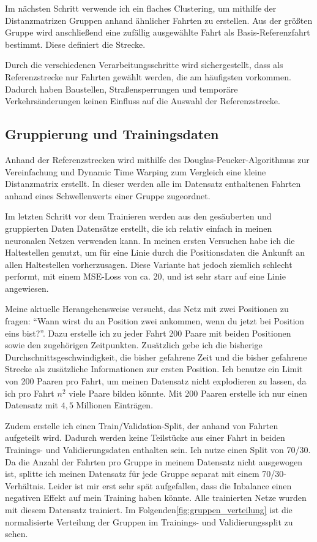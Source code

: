 \documentclass[a4paper]{article}
\begin{document}
    Im nächsten Schritt verwende ich ein flaches Clustering\cite{modernhierachical}, um mithilfe der Distanzmatrizen
    Gruppen anhand ähnlicher Fahrten zu erstellen. Aus der größten Gruppe wird anschließend eine zufällig ausgewählte
    Fahrt als Basis-Referenzfahrt bestimmt. Diese definiert die Strecke.

    Durch die verschiedenen Verarbeitungsschritte wird sichergestellt, dass als Referenzstrecke nur Fahrten gewählt
    werden, die am häufigsten vorkommen. Dadurch haben Baustellen, Straßensperrungen und temporäre Verkehrsänderungen
    keinen Einfluss auf die Auswahl der Referenzstrecke.

    \subsection{Gruppierung und Trainingsdaten}
    \label{subsec:gruppierung}

    Anhand der Referenzstrecken wird mithilfe des Douglas-Peucker-Algorithmus\cite{douglaspeucker} zur Vereinfachung
    und Dynamic Time Warping\cite{dtw} zum Vergleich eine kleine Distanzmatrix erstellt. In dieser werden alle im
    Datensatz enthaltenen Fahrten anhand eines Schwellenwerts einer Gruppe zugeordnet.

    Im letzten Schritt vor dem Trainieren werden aus den gesäuberten und gruppierten Daten Datensätze erstellt, die ich
    relativ einfach in meinen neuronalen Netzen verwenden kann. In meinen ersten Versuchen habe ich die Haltestellen
    genutzt, um für eine Linie durch die Positionsdaten die Ankunft an allen Haltestellen vorherzusagen. Diese Variante
    hat jedoch ziemlich schlecht performt, mit einem MSE-Loss von ca. 20, und ist sehr starr auf eine Linie angewiesen.

    Meine aktuelle Herangehensweise versucht, das Netz mit zwei Positionen zu fragen: \enquote{Wann wirst du an Position
    zwei ankommen, wenn du jetzt bei Position eins bist?}. Dazu erstelle ich zu jeder Fahrt 200 Paare mit beiden
    Positionen sowie den zugehörigen Zeitpunkten. Zusätzlich gebe ich die bisherige Durchschnittsgeschwindigkeit, die
    bisher gefahrene Zeit und die bisher gefahrene Strecke als zusätzliche Informationen zur ersten Position. Ich
    benutze ein Limit von 200 Paaren pro Fahrt, um meinen Datensatz nicht explodieren zu lassen, da ich pro Fahrt
    $n^2$ viele Paare bilden könnte. Mit 200 Paaren erstelle ich nur einen Datensatz mit $4,5$ Millionen Einträgen.


    Zudem erstelle ich einen Train/Validation-Split, der anhand von Fahrten aufgeteilt wird. Dadurch werden keine
    Teilstücke aus einer Fahrt in beiden Trainings- und Validierungsdaten enthalten sein. Ich nutze einen Split von
    70/30. Da die Anzahl der Fahrten pro Gruppe in meinem Datensatz nicht ausgewogen ist, splitte ich meinen Datensatz
    für jede Gruppe separat mit einem 70/30-Verhältnis. Leider ist mir erst sehr spät aufgefallen, dass die Inbalance
    einen negativen Effekt auf mein Training haben könnte. Alle trainierten Netze wurden mit diesem Datensatz trainiert.
    Im Folgenden\ref{fig:gruppen_verteilung} ist die normalisierte Verteilung der Gruppen im Trainings- und
    Validierungssplit zu sehen.
\end{document}
